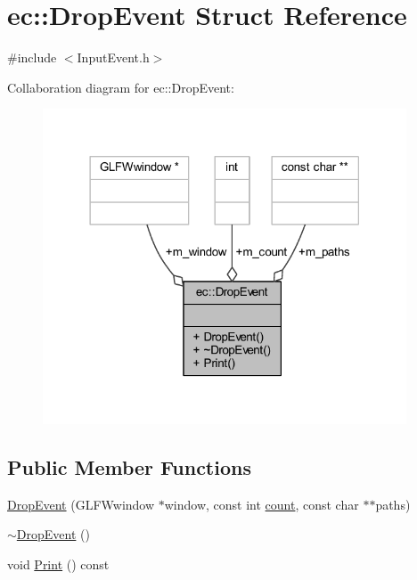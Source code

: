 \hypertarget{structec_1_1_drop_event}{}\section{ec\+:\+:Drop\+Event Struct Reference}
\label{structec_1_1_drop_event}


{\ttfamily \#include $<$Input\+Event.\+h$>$}



Collaboration diagram for ec\+:\+:Drop\+Event\+:\nopagebreak
\begin{figure}[H]
\begin{center}
\leavevmode
\includegraphics[width=306pt]{structec_1_1_drop_event__coll__graph}
\end{center}
\end{figure}
\subsection*{Public Member Functions}
\begin{DoxyCompactItemize}
\item 
\mbox{\hyperlink{structec_1_1_drop_event_a21b2b33aae3ff78510bc2a58e2a7ece3}{Drop\+Event}} (G\+L\+F\+Wwindow $\ast$window, const int \mbox{\hyperlink{namespaceec_a5de6bdb8c4b2ed6e590e721ec998f964ae2942a04780e223b215eb8b663cf5353}{count}}, const char $\ast$$\ast$paths)
\item 
\mbox{\hyperlink{structec_1_1_drop_event_ad68bca5b7ca0c65690fc85d682d057db}{$\sim$\+Drop\+Event}} ()
\item 
void \mbox{\hyperlink{structec_1_1_drop_event_a027a7f2198874f6a2267b7c22f9ff2b7}{Print}} () const
\end{DoxyCompactItemize}
